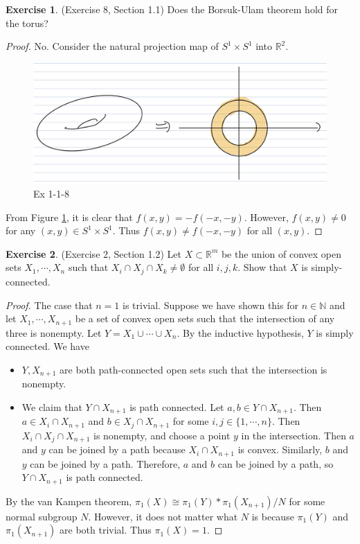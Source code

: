 \documentclass[12pt, psamsfonts]{amsart}
\theoremstyle{definition}
\newtheorem*{exer}{Exercise}
\theoremstyle{remark}
\numberwithin{equation}{section}
\begin{document}
\begin{exer}{(Exercise 8, Section 1.1)}
  Does the Borsuk-Ulam theorem hold for the torus?
\end{exer}

\begin{proof}
  No.
  Consider the natural projection map of $S^1 \times S^1$ into $\mathbb{R}^2$.
  \begin{figure}[!htb]
    \includegraphics[width=.5\linewidth]{img/hatcher/ex-1-1-8.jpeg}
      \caption{Ex 1-1-8}
    \label{fig:ex_1_1_8}
  \end{figure}
  From Figure \ref{fig:ex_1_1_8}, it is clear that $f(x, y) = -f(-x, -y)$.
  However, $f(x, y) \ne 0$ for any $(x, y) \in S^1 \times S^1$.
  Thus $f(x, y) \ne f(-x, -y)$ for all $(x, y)$.
\end{proof}

\begin{exer}{(Exercise 2, Section 1.2)}
  Let $X \subset \mathbb{R}^m$ be the union of convex open sets $X_1, \cdots, X_n$ such that $X_i \cap X_j \cap X_k \ne \emptyset$ for all $i, j, k$.
  Show that $X$ is simply-connected.
\end{exer}

\begin{proof}
  The case that $n = 1$ is trivial.
  Suppose we have shown this for $n \in \mathbb{N}$ and let $X_1, \cdots, X_{n + 1}$ be a set of convex open sets such that the intersection of any three is nonempty.
  Let $Y = X_1 \cup \cdots \cup X_n$.
  By the inductive hypothesis, $Y$ is simply connected.
  We have
  \begin{itemize}
    \item
      $Y, X_{n + 1}$ are both path-connected open sets such that the intersection is nonempty.
    \item
      We claim that $Y \cap X_{n + 1}$ is path connected.
      Let $a, b \in Y \cap X_{n + 1}$.
      Then $a \in X_i \cap X_{n + 1}$ and $b \in X_j \cap X_{n + 1}$ for some $i, j \in \{ 1, \cdots, n \}$.
      Then $X_i \cap X_j \cap X_{n + 1}$ is nonempty, and choose a point $y$ in the intersection.
      Then $a$ and $y$ can be joined by a path because $X_i \cap X_{n + 1}$ is convex.
      Similarly, $b$ and $y$ can be joined by a path.
      Therefore, $a$ and $b$ can be joined by a path, so $Y \cap X_{n + 1}$ is path connected.
  \end{itemize}
  By the van Kampen theorem, $\pi_1(X) \cong \pi_1(Y) * \pi_1(X_{n + 1}) / N$ for some normal subgroup $N$.
  However, it does not matter what $N$ is because $\pi_1(Y)$ and $\pi_1(X_{n + 1})$ are both trivial.
  Thus $\pi_1(X) = 1$.
\end{proof}
\end{document}
